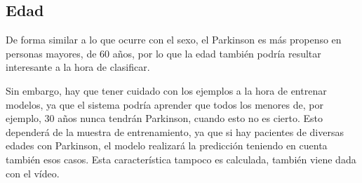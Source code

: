 \subsection{Edad}
De forma similar a lo que ocurre con el sexo, el Parkinson es más propenso en personas mayores, de 60 años, por lo que la edad también podría resultar interesante a la hora de clasificar.

Sin embargo, hay que tener cuidado con los ejemplos a la hora de entrenar modelos, ya que el sistema podría aprender que todos los menores de, por ejemplo, 30 años nunca tendrán Parkinson, cuando esto no es cierto. Esto dependerá de la muestra de entrenamiento, ya que si hay pacientes de diversas edades con Parkinson, el modelo realizará la predicción teniendo en cuenta también esos casos. Esta característica tampoco es calculada, también viene dada con el vídeo.
